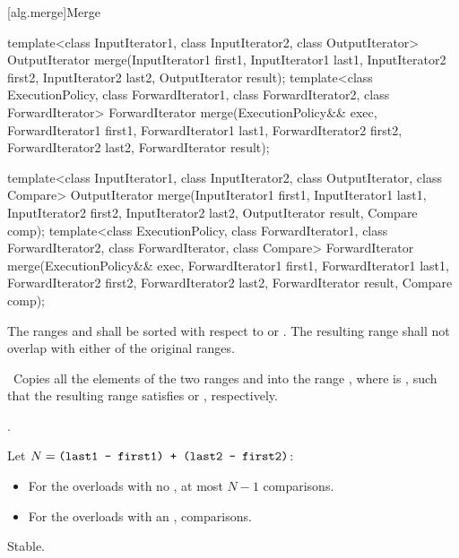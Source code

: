 [alg.merge]{Merge}

%
\begin{itemdecl}
template<class InputIterator1, class InputIterator2,
         class OutputIterator>
  OutputIterator
    merge(InputIterator1 first1, InputIterator1 last1,
          InputIterator2 first2, InputIterator2 last2,
          OutputIterator result);
template<class ExecutionPolicy, class ForwardIterator1, class ForwardIterator2,
         class ForwardIterator>
  ForwardIterator
    merge(ExecutionPolicy&& exec,
          ForwardIterator1 first1, ForwardIterator1 last1,
          ForwardIterator2 first2, ForwardIterator2 last2,
          ForwardIterator result);

template<class InputIterator1, class InputIterator2,
         class OutputIterator, class Compare>
  OutputIterator
    merge(InputIterator1 first1, InputIterator1 last1,
          InputIterator2 first2, InputIterator2 last2,
          OutputIterator result, Compare comp);
template<class ExecutionPolicy, class ForwardIterator1, class ForwardIterator2,
         class ForwardIterator, class Compare>
  ForwardIterator
    merge(ExecutionPolicy&& exec,
          ForwardIterator1 first1, ForwardIterator1 last1,
          ForwardIterator2 first2, ForwardIterator2 last2,
          ForwardIterator result, Compare comp);
\end{itemdecl}

\begin{itemdescr}
\pnum
\requires The ranges  and  shall be
sorted with respect to  or .
The resulting range shall not overlap with either of the original ranges.

\pnum
\effects\ Copies all the elements of the two ranges  and
 into the range , where 
is , such that the resulting range satisfies
 or , respectively.

\pnum
\returns
{}.

\pnum
\complexity Let $N = \texttt{(last1 - first1) + (last2 - first2)}$:
\begin{itemize}
\item For the overloads with no , at most $N - 1$ comparisons.
\item For the overloads with an ,  comparisons.
\end{itemize}

\pnum
\remarks Stable.
\end{itemdescr}

